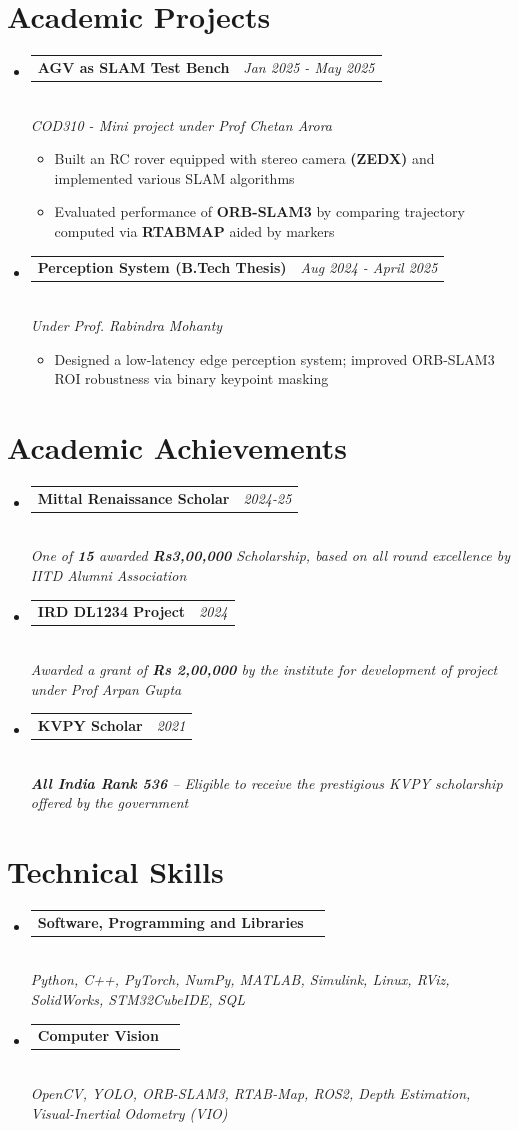 \documentclass[a4paper,11pt]{article}
\makeatletter
\newcommand{\resumeProject}[3]{
\vspace{2.5mm}\item
    \begin{tabular*}{0.98\textwidth}[t]{l@{\extracolsep{\fill}}r}
        \textbf{#1} & \textit{\footnotesize{#3}} \\
    \end{tabular*}\\[-1mm]
    \footnotesize{\textit{#2}}
}
\newcommand{\resumeSubHeadingListStart}{\begin{itemize}[leftmargin=*,labelsep=0mm]}
\newcommand{\resumeItemListStart}{\begin{justify}\begin{itemize}[leftmargin=3ex, rightmargin=2ex, noitemsep,labelsep=1.2mm,itemsep=0mm]\small}
\newcommand{\resumeSubHeadingListEnd}{\end{itemize}\vspace{2mm}}
\newcommand{\resumeItemListEnd}{\end{itemize}\end{justify}\vspace{-2mm}}
\makeatother
\begin{document}
\section{Academic Projects}
\vspace{-2mm}
\resumeSubHeadingListStart
    \resumeProject
      {AGV as SLAM Test Bench}
      {COD310 - Mini project under Prof Chetan Arora}
      {Jan 2025 - May 2025}
      \resumeItemListStart
        \item {Built an RC rover equipped with stereo camera \textbf{(ZEDX)} and implemented various SLAM algorithms}
        \item {Evaluated performance of \textbf{ORB-SLAM3} by comparing trajectory computed via \textbf{RTABMAP} aided by markers}
      \resumeItemListEnd
    \vspace{-1.5mm}
    \resumeProject
      {Perception System (B.Tech Thesis)}
      {Under Prof. Rabindra Mohanty}
      {Aug 2024 - April 2025}
      \resumeItemListStart
        \item {Designed a low-latency edge perception system; improved ORB-SLAM3 ROI robustness via binary keypoint masking}
      \resumeItemListEnd
\resumeSubHeadingListEnd
\vspace{-4mm}

\section{Academic Achievements}
\resumeSubHeadingListStart
    \resumeProject
      {Mittal Renaissance Scholar}
      {One of \textbf{15} awarded \textbf{Rs3,00,000} Scholarship, based on all round excellence by IITD Alumni Association}
      {2024-25}
    \resumeProject
      {IRD DL1234 Project}
      {Awarded a grant of \textbf{Rs 2,00,000} by the institute for development of project under Prof Arpan Gupta}
      {2024}
    \resumeProject
      {KVPY Scholar}
      {\textbf{All India Rank 536} -- Eligible to receive the prestigious KVPY scholarship offered by the government}
      {2021}
\resumeSubHeadingListEnd
\vspace{-2mm}

\section{Technical Skills}
\vspace{-2mm}
\resumeSubHeadingListStart
    \resumeProject
      {Software, Programming and Libraries}
      {Python, C++, PyTorch, NumPy, MATLAB, Simulink, Linux, RViz, SolidWorks, STM32CubeIDE, SQL}
      {}
    \resumeProject
      {Computer Vision}
      {OpenCV, YOLO, ORB-SLAM3, RTAB-Map, ROS2, Depth Estimation, Visual-Inertial Odometry (VIO)}
      {}
\resumeSubHeadingListEnd
\vspace{-1.5mm}
\end{document}
